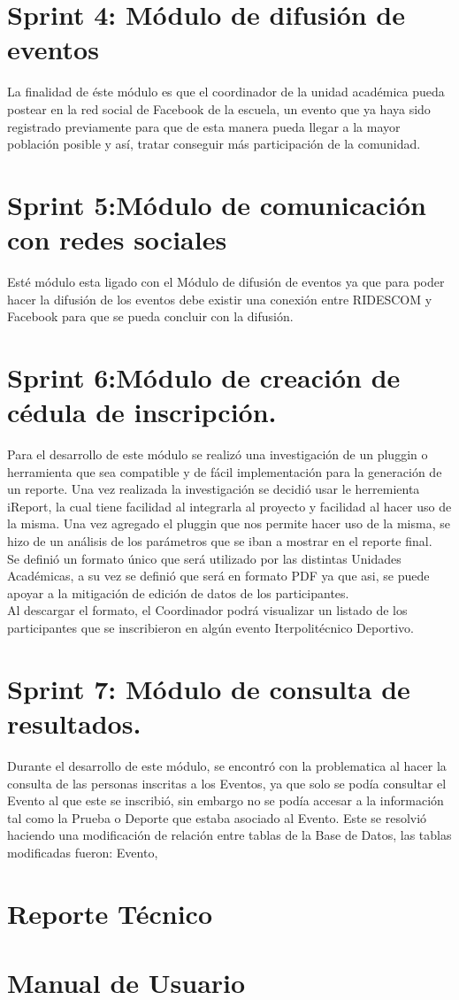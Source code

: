 	\section{Sprint 4: Módulo de difusión de eventos}
	La finalidad de éste módulo es que el coordinador de la unidad académica pueda postear en la red social de Facebook de la escuela, un evento que ya haya sido registrado previamente para que de esta manera pueda llegar a la mayor población posible y así, tratar conseguir más participación de la comunidad.
		
		
	\section{Sprint 5:Módulo de comunicación con redes sociales}	
	Esté módulo esta ligado con el Módulo de difusión de eventos ya que para poder hacer la difusión de los eventos debe existir una conexión entre RIDESCOM y Facebook para que se pueda concluir con la difusión.
	
	\section{Sprint 6:Módulo de creación de cédula de inscripción.}
	Para el desarrollo de este módulo se realizó una investigación de un pluggin o herramienta que sea compatible y de fácil implementación para la generación de un reporte. 
	Una vez realizada la investigación se decidió usar le herremienta iReport, la cual tiene facilidad al integrarla al proyecto y facilidad al hacer uso de la misma.
	Una vez agregado el pluggin que nos permite hacer uso de la misma, se hizo de un análisis de los parámetros que se iban a mostrar en el reporte final. \\
	Se definió un formato único que será utilizado por las distintas Unidades Académicas, a su vez se definió que será en formato PDF ya que asi, se puede apoyar a la mitigación de edición de datos de los participantes. \\
	Al descargar el formato, el Coordinador podrá visualizar un listado de los participantes que se inscribieron en algún evento Iterpolitécnico Deportivo.
 
	
	\section{Sprint 7: Módulo de consulta de resultados.}
	Durante el desarrollo de este módulo, se encontró con la problematica al hacer la consulta de las personas inscritas a los Eventos, ya que solo se podía consultar el Evento al que este se inscribió, sin embargo no se podía accesar a la información tal como la Prueba o Deporte que estaba asociado al Evento.
	Este se resolvió haciendo una modificación de relación entre tablas de la Base de Datos, las tablas modificadas fueron: Evento, 
	
	
	\section{Reporte Técnico}
	
	\section{Manual de Usuario}